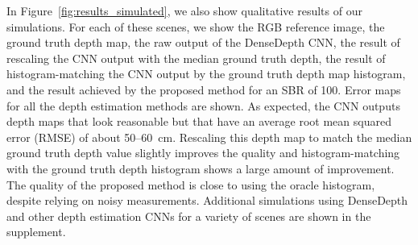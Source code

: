 In Figure~\ref{fig:results_simulated}, we also show qualitative results of our
simulations. For each of these scenes, we show the RGB reference image, the
ground truth depth map, the raw output of the DenseDepth CNN, the result of
rescaling the CNN output with the median ground truth depth, the result of
histogram-matching the CNN output by the ground truth depth map histogram, and
the result achieved by the proposed method for an SBR of 100. Error maps for all
the depth estimation methods are shown. As expected, the CNN outputs depth maps
that look reasonable but that have an average root mean squared error (RMSE) of
about 50--60~cm. Rescaling this depth map to match the median ground truth depth
value slightly improves the quality and histogram-matching with the ground
truth depth histogram shows a large amount of improvement. The quality of the
proposed method is close to using the oracle histogram, despite relying on
noisy  measurements. Additional simulations using DenseDepth and other depth
estimation CNNs for a variety of scenes are shown in the supplement.


